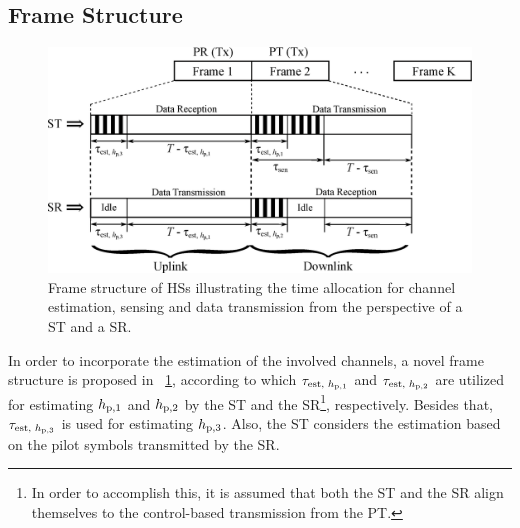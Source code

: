 \subsection{Frame Structure}
\begin{figure}[!t]
\centering
\includegraphics[width = \figscalett]{figures/Frame_Structure}
\caption{Frame structure of HSs illustrating the time allocation for channel estimation, sensing and data transmission from the perspective of a ST and a SR.} 
\label{fig_HS:fs}
\end{figure}
In order to incorporate the estimation of the involved channels, a novel frame structure is proposed in \figurename~\ref{fig_HS:fs}, according to which $\tau_{\text{est, $h_{\text{p,1}}$}}$ and $\tau_{\text{est, $h_{\text{p,2}}$}}$ are utilized for estimating $h_{\text{p,1}}$ and $h_{\text{p,2}}$ by the ST and the SR\footnote{In order to accomplish this, it is assumed that both the ST and the SR align themselves to the control-based transmission from the PT.}, respectively. Besides that, $\tau_{\text{est, $h_{\text{p,3}}$}}$ is used for estimating $h_{\text{p,3}}$. Also, the ST considers the estimation based on the pilot symbols transmitted by the SR. %

